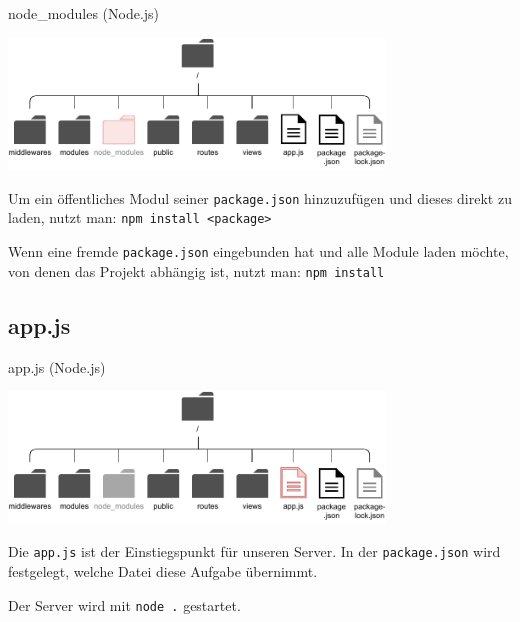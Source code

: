 \begin{bonus}{node\_modules (Node.js)}
    \begin{center}
        \includegraphics[width=0.75\textwidth]{includes/figures/bonus_nodejs_node_modules.pdf}
    \end{center}

    Um ein öffentliches Modul seiner \texttt{package.json} hinzuzufügen und dieses direkt zu laden, nutzt man:
    \texttt{npm install <package>}

    Wenn eine fremde \texttt{package.json} eingebunden hat und alle Module laden möchte, von denen das Projekt abhängig ist, nutzt man:
    \texttt{npm install}
\end{bonus}

\subsection{app.js}

\begin{bonus}{app.js (Node.js)}
    \begin{center}
        \includegraphics[width=0.75\textwidth]{includes/figures/bonus_nodejs_app.pdf}
    \end{center}

    Die \texttt{app.js} ist der Einstiegspunkt für unseren Server.
    In der \texttt{package.json} wird festgelegt, welche Datei diese Aufgabe übernimmt.

    Der Server wird mit \texttt{node .} gestartet.
\end{bonus}

